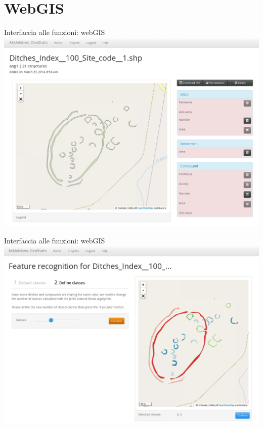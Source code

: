 \documentclass[xcolor=svgnames]{beamer}
\begin{document}
    \section{WebGIS}

        \begin{frame}{Interfaccia alle funzioni: webGIS}
            \includegraphics[width=1\textwidth]{img/shp-detail-1}
        \end{frame}

        \begin{frame}{Interfaccia alle funzioni: webGIS}
            \includegraphics[width=1\textwidth]{img/shp-wizard}
        \end{frame}
\end{document}
